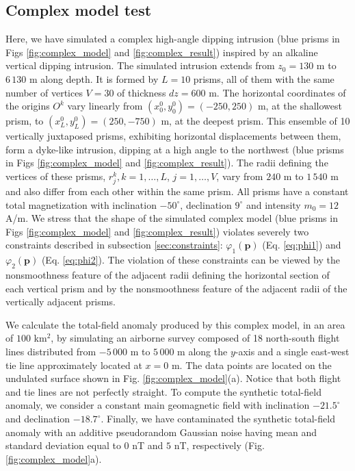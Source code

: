 \subsection{Complex model test}

Here, we have simulated a complex high-angle dipping intrusion (blue prisms in Figs \ref{fig:complex_model} and \ref{fig:complex_result}) inspired by an alkaline vertical dipping intrusion. 
The simulated intrusion extends from $z_0=130$ m to $6\,130$ m along depth.
It is formed by $ L = 10 $ prisms, all of them with the same number of vertices $ V = 30 $ of thickness $ dz = 600 $ m. 
The horizontal coordinates of the origins $ O^k $ vary linearly from $ (x_0^0, y_0^0) = (-250, 250) $ m, at the shallowest prism, to $ (x_L^0, y_L^0) = (250, -750) $ m, at the deepest prism. 
This ensemble of 10 vertically juxtaposed prisms, exhibiting horizontal displacements between them, form a dyke-like intrusion, dipping at a high angle to the northwest (blue prisms in Figs \ref{fig:complex_model} and \ref{fig:complex_result}). 
The radii defining the vertices of these prisms, $ r^k_j, k = 1, \dots, L$, $j = 1,\dots, V$, 
vary from $ 240 $ m to $ 1\,540 $ m and also differ from each other within the same prism. 
All prisms have a constant total magnetization with inclination $ -50^\circ $, declination $ 9^\circ $ and intensity $ m_0 = 12 $ A/m. 
We stress that the shape of the simulated complex model (blue prisms in Figs \ref{fig:complex_model} and \ref{fig:complex_result}) violates severely two constraints described in subsection \ref{sec:constraints}: $\varphi_{1}(\mathbf{p})$ (Eq. \ref{eq:phi1})
and $\varphi_{2}(\mathbf{p})$ (Eq. \ref{eq:phi2}).
The violation of these constraints can be viewed by the nonsmoothness feature of the adjacent radii defining the horizontal section of each vertical prism and by the nonsmoothness feature of the adjacent radii of the vertically adjacent prisms.

We calculate the total-field anomaly produced by this complex model, in an area of $ 100 $ km$^2 $, by simulating an airborne survey composed of 18 north-south flight lines distributed from $ -5\,000 $ m to $ 5\,000 $ m along the $ y $-axis and a single east-west tie line approximately located at $ x = 0 $ m. 
The data points are located on the undulated surface shown in Fig. \ref{fig:complex_model}(a). Notice that both flight and tie lines are not perfectly straight. 
To compute the synthetic total-field anomaly, we consider a constant main geomagnetic field with inclination $ -21.5^\circ $ and declination $ -18.7^\circ $. 
Finally, we have contaminated the synthetic total-field anomaly with an additive pseudorandom Gaussian noise having mean and standard deviation equal to $0$ nT and $5$ nT, respectively (Fig. \ref{fig:complex_model}a).

